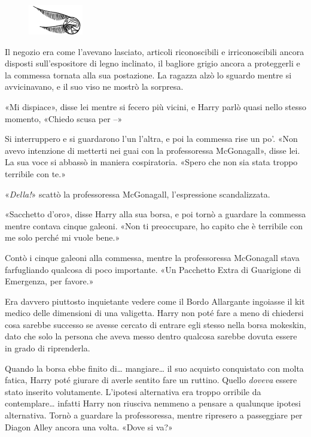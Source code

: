 \begin{figure}[h]
	\includegraphics[scale=0.4]{boccino.png}
	\centering
\end{figure}

Il negozio era come l’avevano lasciato, articoli riconoscibili e irriconoscibili ancora disposti sull’espositore di legno inclinato, il bagliore grigio ancora a proteggerli e la commessa tornata alla sua postazione. La ragazza alzò lo sguardo mentre si avvicinavano, e il suo viso ne mostrò la sorpresa.

«Mi dispiace», disse lei mentre si fecero più vicini, e Harry parlò quasi nello stesso momento, «Chiedo scusa per –»

Si interruppero e si guardarono l’un l’altra, e poi la commessa rise un po’. «Non avevo intenzione di metterti nei guai con la professoressa McGonagall», disse lei. La sua voce si abbassò in maniera cospiratoria. «Spero che non sia stata troppo terribile con te.»

«\textit{Della!}» scattò la professoressa McGonagall, l’espressione scandalizzata.

«Sacchetto d’oro», disse Harry alla sua borsa, e poi tornò a guardare la commessa mentre contava cinque galeoni. «Non ti preoccupare, ho capito che è terribile con me solo perché mi vuole bene.»

Contò i cinque galeoni alla commessa, mentre la professoressa McGonagall stava farfugliando qualcosa di poco importante. «Un Pacchetto Extra di Guarigione di Emergenza, per favore.»

Era davvero piuttosto inquietante vedere come il Bordo Allargante ingoiasse il kit medico delle dimensioni di una valigetta. Harry non poté fare a meno di chiedersi cosa sarebbe successo se avesse cercato di entrare egli stesso nella borsa mokeskin, dato che solo la persona che aveva messo dentro qualcosa sarebbe dovuta essere in grado di riprenderla.

Quando la borsa ebbe finito di… mangiare… il suo acquisto conquistato con molta fatica, Harry poté giurare di averle sentito fare un ruttino. Quello \textit{doveva} essere stato inserito volutamente. L’ipotesi alternativa era troppo orribile da contemplare… infatti Harry non riusciva nemmeno a pensare a qualunque ipotesi alternativa. Tornò a guardare la professoressa, mentre ripresero a passeggiare per Diagon Alley ancora una volta. «Dove si va?»


